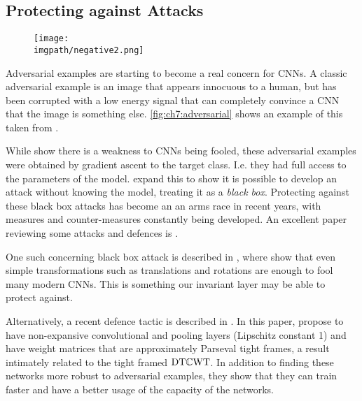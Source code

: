 \subsection{Protecting against Attacks}
\begin{figure}
  \centering
  \texttt{[image: \\imgpath/negative2.png]}
  \label{fig:ch7:adversarial}
\end{figure}
Adversarial examples are starting to become a real concern for CNNs. A classic
adversarial example is an image that appears innocuous to a human, but has been 
corrupted with a low energy signal that can completely convince a CNN that the
image is something else. \autoref{fig:ch7:adversarial} shows an example of this
taken from \cite{szegedy_intriguing_2014}. 

While \citeauthor{szegedy_intriguing_2014} \cite{szegedy_intriguing_2014} show
there is a weakness to CNNs being fooled, these adversarial examples were
obtained by gradient ascent to the target class. I.e. they had full access to
the parameters of the model. \citeauthor{papernot_practical_2017} \cite{papernot_practical_2017} expand this to show
it is possible to develop an attack without knowing the model, treating it as a
\emph{black box}. Protecting against these black box attacks has become an 
an arms race in recent years, with measures and counter-measures constantly
being developed. An excellent paper reviewing some attacks and
defences is \cite{carlini_adversarial_2017}. 

One such concerning black box attack is described in \cite{engstrom_rotation_2017}, where
\citeauthor{engstrom_rotation_2017} show that even simple transformations such
as translations and rotations are enough to fool many modern CNNs. This is
something our invariant layer may be able to protect against.

Alternatively, a recent defence tactic is described in \cite{cisse_parseval_2017}. In
this paper, \citeauthor{cisse_parseval_2017} propose to have non-expansive
convolutional and pooling layers (Lipschitz constant 1) and have weight matrices
that are approximately Parseval tight frames, a result intimately related to
the tight framed $\mathrm{DT}\mathbb{C}\mathrm{WT}$. In addition to finding these
networks more robust to adversarial examples, they show that they can train
faster and have a better usage of the capacity of the networks. 

